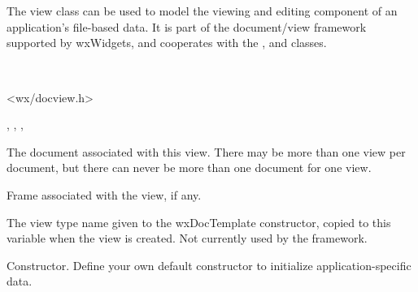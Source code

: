 \section{}\label{wxview}

The view class can be used to model the viewing and editing component of
an application's file-based data. It is part of the document/view framework supported by wxWidgets,
and cooperates with the ,  
and  classes.


\\


<wx/docview.h>


, , ,\rtfsp
{}


\label{wxviewmviewdocument}


The document associated with this view. There may be more than one view per
document, but there can never be more than one document for one view.

\label{wxviewmviewframe}


Frame associated with the view, if any.

\label{wxviewmviewtypename}


The view type name given to the wxDocTemplate constructor, copied to this
variable when the view is created. Not currently used by the framework.

\label{wxviewctor}


Constructor. Define your own default constructor to initialize application-specific
data.

\label{wxviewdtor}


